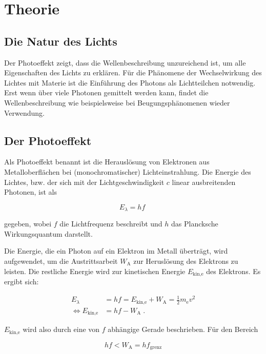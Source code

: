 \section{Theorie}
\label{sec:Theorie}

\subsection{Die Natur des Lichts}

Der Photoeffekt zeigt, dass die Wellenbeschreibung unzureichend ist, um alle Eigenschaften des Lichts
zu erklären. 
Für die Phänomene der Wechselwirkung des Lichtes mit Materie ist die Einführung des Photons als
Lichtteilchen notwendig. Erst wenn über viele Photonen gemittelt werden kann, findet die
Wellenbeschreibung wie beispielsweise bei Beugungsphänomenen wieder Verwendung.

\subsection{Der Photoeffekt}

Als Photoeffekt benannt ist die Herauslösung von Elektronen aus Metalloberflächen bei
(monochromatischer) Lichteinstrahlung. Die Energie des Lichtes, bzw. der sich mit der 
Lichtgeschwindigkeit $c$ linear ausbreitenden Photonen, ist als

\begin{equation}
    E_\lambda = h f \;
    \label{eqn:lichtenergie}
\end{equation}

gegeben, wobei $f$ die Lichtfrequenz beschreibt und $h$ das Plancksche Wirkungsquantum darstellt.

Die Energie, die ein Photon auf ein Elektron im Metall überträgt, wird aufgewendet, um die Austrittsarbeit
$W_\text{A}$ zur Heruslösung des Elektrons zu leisten. Die restliche Energie wird zur kinetischen Energie
$E_\text{kin,e}$ des Elektrons. Es ergibt sich:

\begin{align}
    E_\lambda &= h f = E_\text{kin,e} + W_\text{A} = \frac{1}{2} m_\text{e} v^2 \\
    \iff  E_\text{kin,e} &= h f - W_\text{A}  \; .
    \label{eqn:energie}
\end{align}

$E_\text{kin,e}$ wird also durch eine von $f$ abhängige Gerade beschrieben. Für den Bereich

\begin{equation*}
    h f < W_\text{A} = h f_\text{grenz}
\end{equation*}


